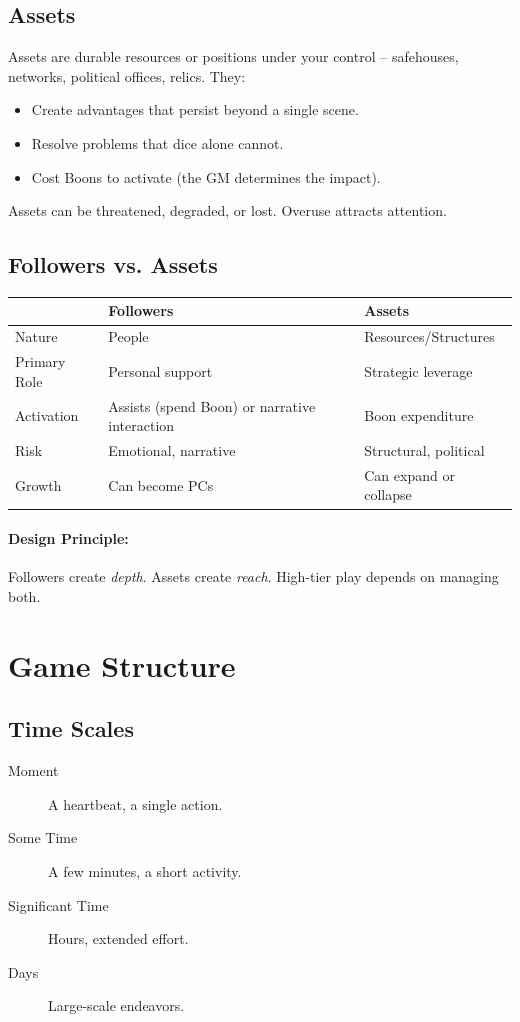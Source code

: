 \subsection{Assets}
Assets are durable resources or positions under your control – safehouses, networks, political offices, relics. They:
\begin{itemize}
  \item Create advantages that persist beyond a single scene.
  \item Resolve problems that dice alone cannot.
  \item Cost Boons to activate (the GM determines the impact).
\end{itemize}
Assets can be threatened, degraded, or lost. Overuse attracts attention.

\subsection{Followers vs. Assets}
\begin{center}
\begin{tabular}{p{3cm}p{5cm}p{5cm}}
\toprule
 & \textbf{Followers} & \textbf{Assets} \\
\midrule
Nature & People & Resources/Structures \\
Primary Role & Personal support & Strategic leverage \\
Activation & Assists (spend Boon) or narrative interaction & Boon expenditure \\
Risk & Emotional, narrative & Structural, political \\
Growth & Can become PCs & Can expand or collapse \\
\bottomrule
\end{tabular}
\end{center}

\paragraph{Design Principle:} Followers create \textit{depth}. Assets create \textit{reach}. High-tier play depends on managing both.

\section{Game Structure}
\label{sec:game-structure}

\subsection{Time Scales}
\begin{description}
  \item[Moment] A heartbeat, a single action.
  \item[Some Time] A few minutes, a short activity.
  \item[Significant Time] Hours, extended effort.
  \item[Days] Large-scale endeavors.
\end{description}

